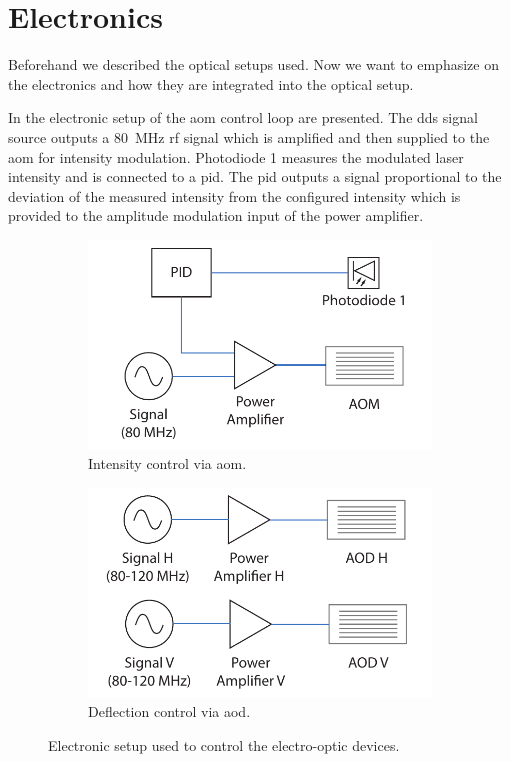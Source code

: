 \section{Electronics}

Beforehand we described the optical setups used. Now we want to emphasize
on the electronics and how they are integrated into the optical setup.

In  the electronic setup of the \gls{aom} control
loop are presented. The \gls{dds} signal source outputs a \SI{80}{\mega\hertz}
\gls{rf} signal which is amplified and then supplied to the \gls{aom} for
intensity modulation. Photodiode \num{1} measures the modulated laser
intensity and is connected to a \gls{pid}. The \gls{pid} outputs a signal
proportional to the deviation of the measured intensity from the configured
intensity which is provided to the amplitude modulation input of the power
amplifier.
\begin{figure}[htbp]
  \centering
  \begin{subfigure}[b]{0.4\textwidth}
    \includegraphics[width=\textwidth]{../figure/setup/aom-control.pdf}
    \caption{Intensity control via \gls{aom}.
    }\label{fig:setup_elop_aom}
  \end{subfigure}
  \begin{subfigure}[b]{0.4\textwidth}
    \includegraphics[width=\textwidth]{../figure/setup/aod-control.pdf}
    \caption{Deflection control via \gls{aod}.
    }\label{fig:setup_elop_aod}
  \end{subfigure}
  \caption{Electronic setup used to control the electro-optic devices.
  }\label{fig:setup_elop}
\end{figure}

